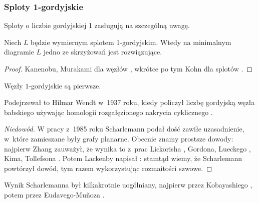 
\subsubsection{Sploty 1-gordyjskie}
Sploty o liczbie gordyjskiej 1 zasługują na szczególną uwagę.

\begin{proposition}
%
    Niech $L$ będzie wymiernym splotem 1-gordyjskim.
    Wtedy na minimalnym diagramie $L$ jedno ze skrzyżowań jest rozwiązujące.
\end{proposition}

\begin{proof}
%
%
%
    Kanenobu, Murakami dla węzłów \cite{kanenobumurakami1986}, wkrótce po tym Kohn dla splotów \cite{kohn1991}.
\end{proof}

\begin{proposition}
\label{prp:unknotting_one_prime}%
    Węzły $1$-gordyjskie są pierwsze.
\end{proposition}

Podejrzewał to Hilmar Wendt w~1937 roku, kiedy policzył liczbę gordyjską węzła babskiego używając homologii rozgałęzionego nakrycia cyklicznego \cite{wendt1937}.
%

\begin{proof}[Niedowód]
    W pracy \cite{scharlemann1985} z~1985 roku Scharlemann podał dość zawiłe uzasadnienie, w~które zamieszane były grafy planarne.
%
    Obecnie znamy prostsze dowody: najpierw Zhang \cite{zhang1991} zauważył, że wynika to z~prac Lickorisha \cite{lickorish1985}, Gordona, Lueckego \cite{luecke1987}, Kima, Tollefsona \cite{tollefson1980}.
%
%
%
%
%
%
    Potem Lackenby napisał \cite{lackenby1997}: stamtąd wiemy, że Scharlemann powtórzył dowód, tym razem wykorzystując rozmaitości szwowe.
%
%
\end{proof}

Wynik Scharlemanna był kilkakrotnie uogólniany, najpierw przez Kobayashiego \cite{kobayashit1989}, potem przez Eudavego-Muñoza \cite{eudave1995}.
%
%

